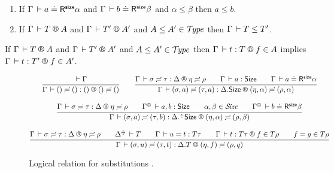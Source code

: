 \documentclass[acmsmall,screen]{acmart}\settopmatter{}
\newcommand{\LONGVERSION}[1]{}
\begin{document}
\begin{lemma}
\label{lem:lrsub}
\bla
\begin{enumerate}
\item
   If\/ $\Gamma \,\vdash a \doteq \mathsf{R}^{\mathsf{size}} \alpha$ and $\Gamma \,\vdash b \doteq \mathsf{R}^{\mathsf{size}} \beta$ and $\alpha \leq \beta$ then $a \leq b$.
\item
   If\/ $\RG \Gamma T A$ and $\RG \Gamma {T'} {A'}$ and $A \leq A' \in \mathcal{T}\!\mathit{ype}$ then $\Gamma \,\vdash T \leq T'$.
\end{enumerate}
\end{lemma}
\LONGVERSION{
\begin{proof}
  The proof is analogous to the one  for algorithmic subtyping to come (Lemma~\ref{lem:lrasub}).
\end{proof}
}

\begin{lemma}
\label{lem:lrsump}
   If\/ $\RG \Gamma T A$ and $\RG \Gamma {T'} {A'}$ and $A \leq A' \in \mathcal{T}\!\mathit{ype}$ then
   $\LR \Gamma t T f A$ implies $\LR \Gamma t {T'} f {A'}$.
\end{lemma}


\begin{figure}[htbp]
\hrulefill
\begin{gather*}
  \ru{\der \Gamma
    }{\LRSub \Gamma {\sempty} {\sempty} {\cempty} {\sempty} {\sempty}}
\qquad
  \ru{\LRSub \Gamma \sigma \tau \Delta \eta \rho \qquad
      \Gamma \der a : \Size \qquad
      \LRSize \Gamma a \alpha
    }{\LRSub \Gamma {(\sigma,a)} {(\tau,a)} {\cext \Delta \Size} {(\eta,\alpha)} {(\rho,\alpha)}}
\\[2ex]
  \ru{\LRSub \Gamma \sigma \tau \Delta \eta \rho \qquad
      \resurrect \Gamma \der a, b : \Size \qquad
      \alpha,\beta \in \SIZE \qquad
      \LRSize {\resurrect\Gamma} b \beta
    }{\LRSub \Gamma {(\sigma,a)} {(\tau,b)} {\erext \Delta \Size} {(\eta,\alpha)} {(\rho,\beta)}}
\\[2ex]
  \ru{\LRSub \Gamma \sigma \tau \Delta \eta \rho \qquad
      \resurrect \Delta \der T \qquad
      \Gamma \der u = t : T\tau \qquad
      \LR \Gamma t {T \tau} f {T \rho} \qquad
      f = g \in T\rho
    }{\LRSub \Gamma {(\sigma,u)} {(\tau,t)} {\cext \Delta T} {(\eta,f)} {(\rho,q)}}
\end{gather*}
\hrulefill
\caption{Logical relation for substitutions
  \fbox{$\LRSub \Gamma \sigma \tau \Delta \eta \rho$}.}
\label{fig:lrsub}
\end{figure}
\end{document}
